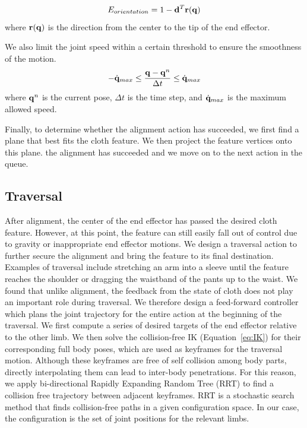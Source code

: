 \begin{equation}
  E_{orientation} = 1-\mathbf{d}^T\mathbf{r(q})
  \label{eq:orientation}
\end{equation}
where $\mathbf{r(q)}$ is the direction from the center to the tip of the end effector.

We also limit the joint speed within a certain threshold to ensure the smoothness of the motion.
\begin{equation}
  -\dot{\mathbf{q}}_{max} \leq \frac{\mathbf{q} - \mathbf{q}^n}{\Delta t} \leq \dot{\mathbf{q}}_{max}
  \label{eq:speed}
\end{equation}
where $\mathbf{q}^n$ is the current pose, $\Delta t$ is the time step, and $\dot{\mathbf{q}}_{max}$ is the maximum allowed speed.

Finally, to determine whether the alignment action has succeeded, we first find a plane that best fits the cloth feature. We then project the feature vertices onto this plane. 
  the alignment has succeeded and we move on to the next action in the queue.

\subsection{Traversal}
After alignment, the center of the end effector has passed the desired cloth feature. However, at this point, the feature can still easily fall out of control due to gravity or inappropriate end effector motions. We design a traversal action to further secure the alignment and bring the feature to its final destination. Examples of traversal include stretching an arm into a sleeve until the feature reaches the shoulder or dragging the waistband of the pants up to the waist.  We found that unlike alignment, the feedback from the state of cloth does not play an important role during traversal. We therefore design a feed-forward controller which plans the joint trajectory for the entire action at the beginning of the traversal. We first compute a series of desired targets of the end effector relative to the other limb. We then solve the collision-free IK (Equation~\ref{eq:IK}) for their corresponding full body poses, which are used as keyframes for the traversal motion. Although these keyframes are free of self collision among body parts, directly interpolating them can lead to inter-body penetrations. For this reason, we apply bi-directional Rapidly Expanding Random Tree (RRT) \cite{LaValleK:2001} to find a collision free trajectory between adjacent keyframes. RRT is a stochastic search method that finds collision-free paths in a given configuration space. In our case, the configuration is the set of joint positions for the relevant limbs.

